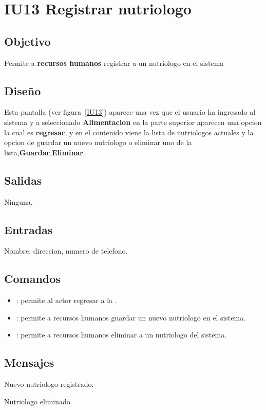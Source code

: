 \section{IU13 Registrar nutriologo}

\subsection{Objetivo}
	Permite a {\bf recursos humanos} registrar a un nutriologo en el sistema

\subsection{Diseño}
	Esta pantalla  (ver figura~\ref{IU13}) aparece una vez que el usuario ha ingresado al sistema y a seleccionado {\bf Alimentacion}
 en la parte superior aparecen una opcion la cual es {\bf regresar}, y en el contenido viene la lista de nutriologos actuales y la opcion de guardar un nuevo nutriologo o eliminar uno de la lista,{\bf Guardar},{\bf Eliminar}. 

 

\subsection{Salidas}

	Ninguna.

\subsection{Entradas}
Nombre, direccion, numero de telefono.

\subsection{Comandos}
\begin{itemize}
	\item {}: permite al actor regresar a la .
 	\item {}: permite a recursos humanos guardar un nuevo nutriologo en el sistema.
  	\item {}: permite a recursos humanos eliminar a un nutriologo del sistema.
\end{itemize}

\subsection{Mensajes}

\begin{Citemize}
	\item Nuevo nutriologo registrado.
        \item Nutriologo eliminado.
\end{Citemize}

